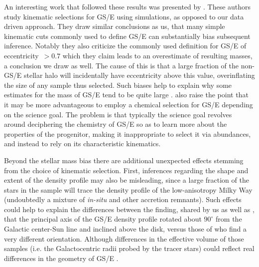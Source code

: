 An interesting work that followed these results was presented by \textcite{carrillo23}. These authors study kinematic selections for GS/E using simulations, as opposed to our data driven approach. They draw similar conclusions as us, that many simple kinematic cuts commonly used to define GS/E can substantially bias subsequent inference. Notably they also criticize the commonly used definition for GS/E of eccentricity~$> 0.7$ which they claim leads to an overestimate of resulting masses, a conclusion we draw as well. The cause of this is that a large fraction of the non-GS/E stellar halo will incidentally have eccentricity above this value, overinflating the size of any sample thus selected. Such biases help to explain why some estimates for the mass of GS/E tend to be quite large \parencite[e.g.][ who use this eccentricity cut to define GS/E]{han22}. \textcite{carrillo23} also raise the point that it may be more advantageous to employ a chemical selection for GS/E depending on the science goal. The problem is that typically the science goal revolves around deciphering the chemistry of GS/E so as to learn more about the properties of the progenitor, making it inappropriate to select it via abundances, and instead to rely on its characteristic kinematics.

Beyond the stellar mass bias there are additional unexpected effects stemming from the choice of kinematic selection. First, inferences regarding the shape and extent of the density profile may also be misleading, since a large fraction of the stars in the sample will trace the density profile of the low-anisotropy Milky Way (undoubtedly a mixture of \textit{in-situ} and other accretion remnants). Such effects could help to explain the differences between the finding, shared by us as well as \textcite{iorio21}, that the principal axis of the GS/E density profile rotated about $90^\circ$ from the Galactic center-Sun line and inclined above the disk, versus those of \textcite{han22} who find a very different orientation. Although differences in the effective volume of those samples (i.e. the Galactocentric radii probed by the tracer stars) could reflect real differences in the geometry of GS/E \parencite[see][ for an example of this in the outer halo]{chandra23}. 

